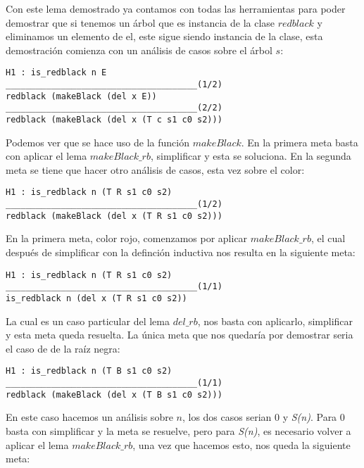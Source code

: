 Con este lema demostrado ya contamos con todas las herramientas para poder demostrar que si tenemos
un \'arbol que es instancia de la clase \hyperref[class_rb]{$redblack$} y eliminamos un elemento de 
el, este sigue siendo instancia de la clase, esta demostraci\'on comienza con un análisis de casos 
sobre el \'arbol $s$:

\begin{verbatim}
H1 : is_redblack n E
______________________________________(1/2)
redblack (makeBlack (del x E))
______________________________________(2/2)
redblack (makeBlack (del x (T c s1 c0 s2)))
\end{verbatim}

Podemos ver que se hace uso de la funci\'on \hyperref[raiz_negra_func]{$makeBlack$}. En la primera 
meta basta con aplicar el lema $makeBlack\_rb$, simplificar y esta se soluciona. En la segunda meta 
se tiene que hacer otro an\'alisis de casos, esta vez sobre el color:

\begin{verbatim}
H1 : is_redblack n (T R s1 c0 s2)
______________________________________(1/2)
redblack (makeBlack (del x (T R s1 c0 s2)))

\end{verbatim}

En la primera meta, color rojo, comenzamos por aplicar $makeBlack\_rb$, el cual despu\'es de
simplificar con la definci\'on inductiva nos resulta en la siguiente meta:

\begin{verbatim}
H1 : is_redblack n (T R s1 c0 s2)
______________________________________(1/1)
is_redblack n (del x (T R s1 c0 s2))
\end{verbatim}

La cual es un caso particular del lema \hyperref[lema_6]{$del\_rb$}, nos basta con aplicarlo, 
simplificar y esta meta queda resuelta. La \'unica meta que nos quedaría por demostrar seria el caso 
de de la raíz negra:

\begin{verbatim}
H1 : is_redblack n (T B s1 c0 s2)
______________________________________(1/1)
redblack (makeBlack (del x (T B s1 c0 s2)))
\end{verbatim}

En este caso hacemos un análisis sobre $n$, los dos casos serian 0 y \textit{S(n)}. Para 0 basta
con simplificar y la meta se resuelve, pero para \textit{S(n)}, es necesario volver a aplicar el
lema $makeBlack\_rb$, una vez que hacemos esto, nos queda la siguiente meta:

